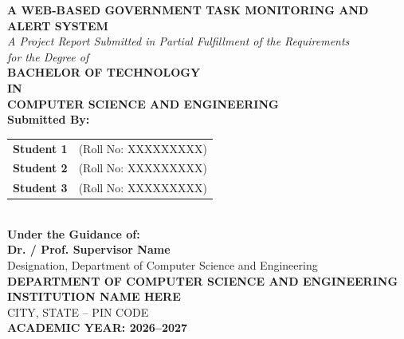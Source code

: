 \begin{titlepage}
\begin{center}
    \vspace*{0.5cm}
    
    {\Huge \textbf{A WEB-BASED GOVERNMENT TASK MONITORING AND ALERT SYSTEM}}\\[1.5cm]
    
    {\large \textit{A Project Report Submitted in Partial Fulfillment of the Requirements\\for the Degree of}}\\[0.8cm]
    
    {\Large \textbf{BACHELOR OF TECHNOLOGY}}\\[0.4cm]
    {\large \textbf{IN}}\\[0.4cm]
    {\Large \textbf{COMPUTER SCIENCE AND ENGINEERING}}\\[1.5cm]
    
    \textbf{Submitted By:}\\[0.3cm]
    \begin{tabular}{ll}
        \textbf{Student 1} & (Roll No: XXXXXXXXX) \\
        \textbf{Student 2} & (Roll No: XXXXXXXXX) \\
        \textbf{Student 3} & (Roll No: XXXXXXXXX) \\
    \end{tabular}\\[1.5cm]
    
    \textbf{Under the Guidance of:}\\[0.3cm]
    {\large \textbf{Dr. / Prof. Supervisor Name}}\\[0.2cm]
    {\small Designation, Department of Computer Science and Engineering}\\[1.5cm]
    
    
    {\large \textbf{DEPARTMENT OF COMPUTER SCIENCE AND ENGINEERING}}\\[0.2cm]
    {\large \textbf{INSTITUTION NAME HERE}}\\[0.2cm]
    {\small CITY, STATE -- PIN CODE}\\[0.5cm]
    {\large \textbf{ACADEMIC YEAR: 2026--2027}}
    
\end{center}
\end{titlepage}
\clearpage
